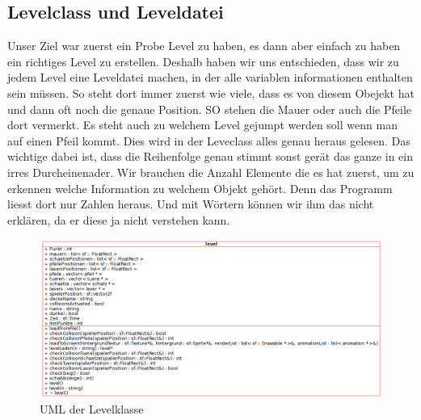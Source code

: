 \documentclass[11pt,a4paper]{scrbook}
\begin{document}
\subsection{Levelclass und Leveldatei}
Unser Ziel war zuerst ein Probe Level zu haben, es dann aber einfach zu haben ein richtiges Level zu erstellen. Deshalb haben wir uns entschieden, dass wir zu jedem Level eine Leveldatei machen, in der alle variablen informationen 
enthalten sein müssen. So steht dort immer zuerst wie viele, dass es von diesem Obejekt hat und dann oft noch die genaue 
Position. SO stehen die Mauer oder auch die Pfeile dort vermerkt. Es steht auch zu welchem Level gejumpt werden soll wenn 
man auf einen Pfeil kommt.
Dies wird in der Leveclass alles genau heraus gelesen. Das wichtige dabei ist, dass die Reihenfolge genau stimmt sonst gerät 
das ganze in ein irres Durcheinenader. Wir brauchen die Anzahl Elemente die es hat zuerst, um zu erkennen welche Information 
zu welchem Objekt gehört. Denn das Programm liesst dort nur Zahlen heraus. Und mit Wörtern können wir ihm das nicht erklären, 
da er diese ja nicht verstehen kann.

\begin{figure}[h]
\centering
\includegraphics[scale=0.45]{img/level_uml.png}
\caption{UML der Levelklasse}
\end{figure}
\end{document}
